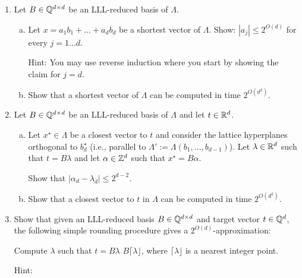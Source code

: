 \begin{enumerate}
  \item
    Let $B \in \mathbb{Q}^{d \times d}$ be an LLL-reduced basis of $\Lambda$.
    \begin{enumerate}[(a)]
      \item Let $x = a_1 b_1 + \dots + a_d b_d$ be a shortest vector of $\Lambda$.
        Show: $|a_j| \leq 2^{O(d)}$ for every $j = 1 \dots d$.

        Hint: You may use reverse induction where you start by showing the claim for $j = d$.

      \item Show that a shortest vector of $\Lambda$ can be computed in time $2^{O(d^2)}$.
    \end{enumerate}

  \item
    Let $B \in \mathbb{Q}^{d \times d}$ be an LLL-reduced basis of $\Lambda$ and let $t \in \mathbb{R}^d$.
    \begin{enumerate}[(a)]
      \item Let $x^\star \in \Lambda$ be a closest vector to $t$ and consider the lattice hyperplanes
        orthogonal to $b_d^\star$ (i.e., parallel to $\Lambda' := \Lambda(b_1,\ldots,b_{d-1})$).
        Let $\lambda \in \mathbb{R}^d$ such that $t = B \lambda$
        and let $\alpha \in \mathbb{Z}^d$ such that $x^\star = B \alpha$.

        Show that $|\alpha_d - \lambda_d| \leq 2^{d-2}$.

      \item Show that a closest vector to $t$ in $\Lambda$ can be computed in time $2^{O(d^2)}$.
    \end{enumerate}

  \item
    Show that given an LLL-reduced basis $B \in \mathbb{Q}^{d \times d}$ and target vector $t \in \mathbb{Q}^d$,
    the following simple rounding procedure gives a $2^{O(d)}$-approximation:
    \begin{codebox}
      \li Compute $\lambda$ such that $t = B \lambda$
      \li \Return $B \lceil \lambda \rfloor$, where $\lceil \lambda \rfloor$ is a nearest integer point.
    \end{codebox}

    Hint: \cite{MR856638}
\end{enumerate}

